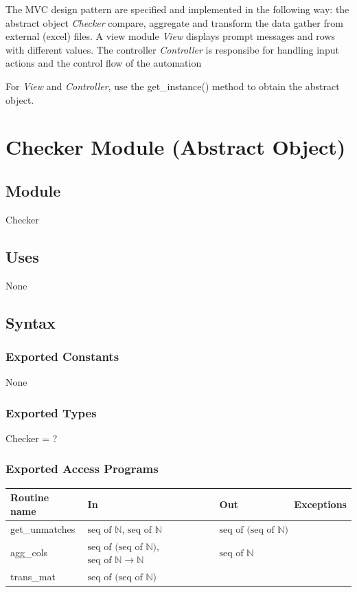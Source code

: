\documentclass[12pt]{article}
\begin{document}
\medskip

\noindent The MVC design pattern are specified and implemented in the following way: 
the abstract object \textit{Checker} compare, aggregate and transform the data gather 
from external (excel) files. A view module \textit{View} displays prompt messages and 
rows with different values. The controller \textit{Controller} is responsibe for handling 
input actions and the control flow of the automation

\medskip

\noindent For \textit{View} and \textit{Controller}, use the get\_instance() method to obtain the abstract object.

\newpage

\section* {Checker Module (Abstract Object)}

\subsection*{Module}

Checker

\subsection* {Uses}

None

\subsection* {Syntax}

\subsubsection* {Exported Constants}

None

\subsubsection* {Exported Types}

Checker = ?

\subsubsection* {Exported Access Programs}

\begin{tabular}{| l | l | l | p{5cm} |}
\hline
\textbf{Routine name} & \textbf{In} & \textbf{Out} & \textbf{Exceptions}\\
\hline
get\_unmatches & $\text{seq of } \mathbb{N}$, $\text{seq of } \mathbb{N}$ & $\text{seq of (seq of } \mathbb{N} \text{)}$ & \\
\hline
agg\_cols & $\text{seq of (seq of } \mathbb{N} \text{)}$, $\text{seq of } \mathbb{N} \rightarrow \mathbb{N}$ & $\text{seq of } \mathbb{N}$ & \\
\hline
trans\_mat & $\text{seq of (seq of } \mathbb{N} \text{)}$ & & \\
\hline

\end{tabular}
\end{document}

